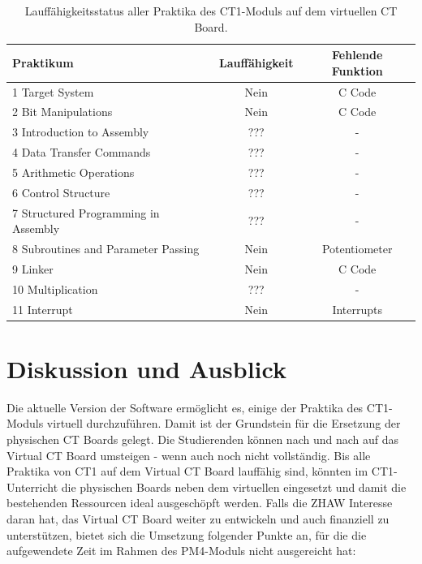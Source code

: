 \documentclass[10pt]{article}
\begin{document}
\begin{table}[ht]
\begin{tabular}{ | l | c | c |}
	\hline
    \textbf{Praktikum} & \textbf{Lauffähigkeit} & \textbf{Fehlende Funktion} \\
	\hline
    1 Target System & Nein & C Code \\
	\hline
    2 Bit Manipulations & Nein & C Code \\
\hline
    3 Introduction to Assembly & ??? & - \\
\hline
    4 Data Transfer Commands & ??? & - \\
\hline
    5 Arithmetic Operations & ??? & - \\
\hline
    6 Control Structure & ??? & - \\
\hline
    7 Structured Programming in Assembly & ??? & - \\
\hline
    8 Subroutines and Parameter Passing & Nein & Potentiometer \\
\hline
    9 Linker & Nein & C Code \\
\hline
    10 Multiplication & ??? & - \\
\hline
    11 Interrupt & Nein & Interrupts \\
\hline
\end{tabular}
\caption[size=8pt]{Lauffähigkeitsstatus aller Praktika des CT1-Moduls auf dem virtuellen CT Board.}
\label{praktika}
\end{table}

\section{Diskussion und Ausblick}

Die aktuelle Version der Software ermöglicht es, einige der Praktika des CT1-Moduls virtuell durchzuführen. Damit ist der Grundstein für die Ersetzung der physischen CT Boards gelegt. Die Studierenden können nach und nach auf das \glqq Virtual CT Board\grqq{} umsteigen - wenn auch noch nicht vollständig. Bis alle Praktika von CT1 auf dem \glqq Virtual CT Board\grqq{} lauffähig sind, könnten im CT1-Unterricht die physischen Boards neben dem virtuellen eingesetzt und damit die bestehenden Ressourcen ideal ausgeschöpft werden. Falls die ZHAW Interesse daran hat, das \glqq Virtual CT Board\grqq{} weiter zu entwickeln und auch finanziell zu unterstützen, bietet sich die Umsetzung folgender Punkte an, für die die aufgewendete Zeit im Rahmen des PM4-Moduls nicht ausgereicht hat:
\end{document}
